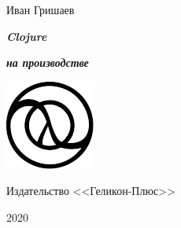 
\begin{titlepage}

\begin{center}

  {\large Иван Гришаев}

  \vspace*{5cm}

  {\Huge\textbf{\emph{Clojure}}}

  {\large\textbf{\emph{на производстве}}}

  \vspace{1cm}

  \includegraphics{logo-gray.pdf}

  \vspace*{\fill}

  {Издательство <<Геликон-Плюс>>}

  {2020}

\end{center}

\end{titlepage}
